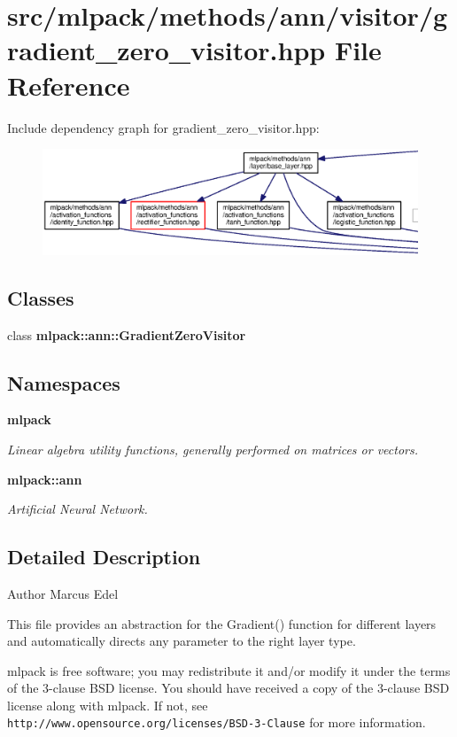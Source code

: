 \section{src/mlpack/methods/ann/visitor/gradient\+\_\+zero\+\_\+visitor.hpp File Reference}
\label{gradient__zero__visitor_8hpp}
Include dependency graph for gradient\+\_\+zero\+\_\+visitor.\+hpp\+:
\nopagebreak
\begin{figure}[H]
\begin{center}
\leavevmode
\includegraphics[width=350pt]{gradient__zero__visitor_8hpp__incl}
\end{center}
\end{figure}
\subsection*{Classes}
\begin{DoxyCompactItemize}
\item 
class {\bf mlpack\+::ann\+::\+Gradient\+Zero\+Visitor}
\end{DoxyCompactItemize}
\subsection*{Namespaces}
\begin{DoxyCompactItemize}
\item 
 {\bf mlpack}
\begin{DoxyCompactList}\small\item\em Linear algebra utility functions, generally performed on matrices or vectors. \end{DoxyCompactList}\item 
 {\bf mlpack\+::ann}
\begin{DoxyCompactList}\small\item\em Artificial Neural Network. \end{DoxyCompactList}\end{DoxyCompactItemize}


\subsection{Detailed Description}
\begin{DoxyAuthor}{Author}
Marcus Edel
\end{DoxyAuthor}
This file provides an abstraction for the Gradient() function for different layers and automatically directs any parameter to the right layer type.

mlpack is free software; you may redistribute it and/or modify it under the terms of the 3-\/clause B\+SD license. You should have received a copy of the 3-\/clause B\+SD license along with mlpack. If not, see {\tt http\+://www.\+opensource.\+org/licenses/\+B\+S\+D-\/3-\/\+Clause} for more information. 